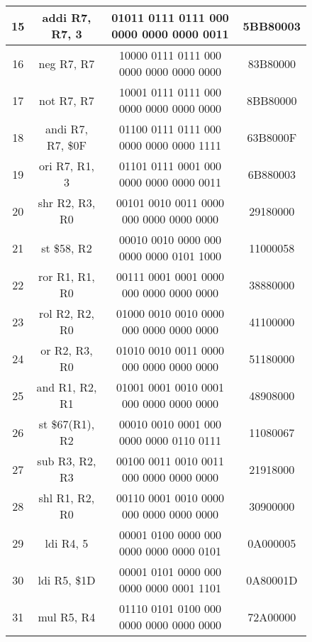 \documentclass{article}
\begin{document}
\begin{figure}[h!]
\begin{center}
\begin{tabular}{|c|c|c|c|}
                \hline
                15 & addi R7, R7, 3 & 01011 0111 0111 000 0000 0000 0000 0011 & 5BB80003 \\
                \hline
                16 & neg R7, R7 & 10000 0111 0111 000 0000 0000 0000 0000 & 83B80000 \\
                \hline
                17 & not R7, R7 & 10001 0111 0111 000 0000 0000 0000 0000 & 8BB80000 \\
                \hline
                18 & andi R7, R7, \$0F & 01100 0111 0111 000 0000 0000 0000 1111 & 63B8000F \\
                \hline
                19 & ori R7, R1, 3 & 01101 0111 0001 000 0000 0000 0000 0011 & 6B880003 \\
                \hline
                20 & shr R2, R3, R0 & 00101 0010 0011 0000 000 0000 0000 0000 & 29180000 \\
                \hline
                21 & st \$58, R2 & 00010 0010 0000 000 0000 0000 0101 1000 & 11000058 \\
                \hline
                22 & ror R1, R1, R0 & 00111 0001 0001 0000 000 0000 0000 0000 & 38880000 \\
                \hline
                23 & rol R2, R2, R0 & 01000 0010 0010 0000 000 0000 0000 0000 & 41100000 \\
                \hline 
                24 & or R2, R3, R0 & 01010 0010 0011 0000 000 0000 0000 0000 & 51180000 \\
                \hline
                25 & and R1, R2, R1 & 01001 0001 0010 0001 000 0000 0000 0000 & 48908000 \\
                \hline
                26 & st \$67(R1), R2 & 00010 0010 0001 000 0000 0000 0110 0111 & 11080067 \\
                \hline
                27 & sub R3, R2, R3 & 00100 0011 0010 0011 000 0000 0000 0000 & 21918000 \\
                \hline
                28 & shl R1, R2, R0 & 00110 0001 0010 0000 000 0000 0000 0000 & 30900000 \\
                \hline
                29 & ldi R4, 5 & 00001 0100 0000 000 0000 0000 0000 0101 & 0A000005 \\
                \hline
                30 & ldi R5, \$1D & 00001 0101 0000 000 0000 0000 0001 1101 & 0A80001D \\
                \hline
                31 & mul R5, R4  & 01110 0101 0100 000 0000 0000 0000 0000 & 72A00000 \\

\end{tabular}
\end{center}
\end{figure}
\end{document}
